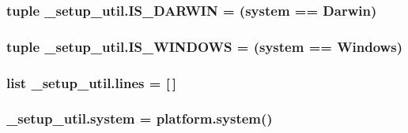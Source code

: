 \subsubsection[{\texorpdfstring{I\+S\+\_\+\+D\+A\+R\+W\+IN}{IS_DARWIN}}]{\setlength{\rightskip}{0pt plus 5cm}tuple \+\_\+setup\+\_\+util.\+I\+S\+\_\+\+D\+A\+R\+W\+IN = ({\bf system} == \textquotesingle{}Darwin\textquotesingle{})}\hypertarget{namespace__setup__util_aecbb100ce6f94bb3c7e16d58fde05f96}{}\label{namespace__setup__util_aecbb100ce6f94bb3c7e16d58fde05f96}
\subsubsection[{\texorpdfstring{I\+S\+\_\+\+W\+I\+N\+D\+O\+WS}{IS_WINDOWS}}]{\setlength{\rightskip}{0pt plus 5cm}tuple \+\_\+setup\+\_\+util.\+I\+S\+\_\+\+W\+I\+N\+D\+O\+WS = ({\bf system} == \textquotesingle{}Windows\textquotesingle{})}\hypertarget{namespace__setup__util_a6fe69c2dbd92959b6651a28cbb846e6e}{}\label{namespace__setup__util_a6fe69c2dbd92959b6651a28cbb846e6e}
\subsubsection[{\texorpdfstring{lines}{lines}}]{\setlength{\rightskip}{0pt plus 5cm}list \+\_\+setup\+\_\+util.\+lines = \mbox{[}$\,$\mbox{]}}\hypertarget{namespace__setup__util_a8618d8be5f729d4c9696daa5e083a001}{}\label{namespace__setup__util_a8618d8be5f729d4c9696daa5e083a001}
\subsubsection[{\texorpdfstring{system}{system}}]{\setlength{\rightskip}{0pt plus 5cm}\+\_\+setup\+\_\+util.\+system = platform.\+system()}\hypertarget{namespace__setup__util_ae9fca6a80a6923f4580be72f68fee325}{}\label{namespace__setup__util_ae9fca6a80a6923f4580be72f68fee325}
